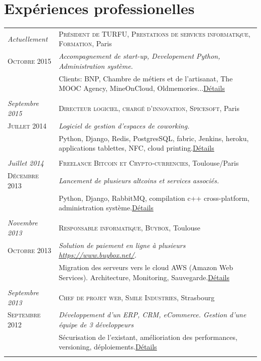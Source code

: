 \documentclass[a4paper,10pt]{article}
\begin{document}
\section{Expériences professionelles}
\begin{tabular}{p{}|p{}}	

	\emph{Actuellement} & \textsc{Président de TURFU, Prestations de services informatique, Formation}, Paris \\\textsc{Octobre 2015}&\emph{Accompagnement de start-up, Developement Python, Administration système.}\\&\footnotesize{Clients: BNP, Chambre de métiers et de l'artisanat, The MOOC Agency, MineOnCloud, Oldmemories...\hyperlink{freelance}{\hfill \footnotesize Détails}}\\\multicolumn{2}{c}{} \\
	
	\emph{Septembre 2015} & \textsc{Directeur logiciel, chargé d'innovation, Spicesoft}, Paris \\\textsc{Juillet 2014}&\emph{Logiciel de gestion d'espaces de coworking.}\\&\footnotesize{Python, Django, Redis, PostgresSQL, fabric, Jenkins, heroku, applications tablettes, NFC, cloud printing.\hyperlink{spicesoft}{\hfill \footnotesize Détails}}\\\multicolumn{2}{c}{} \\
	
	\emph{Juillet 2014} & \textsc{Freelance Bitcoin et Crypto-currencies}, Toulouse/Paris \\\textsc{Décembre 2013}&\emph{Lancement de plusieurs altcoins et services associés.}\\&\footnotesize{Python, Django, RabbitMQ, compilation c++ cross-platform, administration système.\hyperlink{bitcoin}{\hfill \footnotesize Détails}}\\\multicolumn{2}{c}{} \\

	\emph{Novembre 2013} & \textsc{Responsable informatique, Buybox}, Toulouse \\\textsc{Octobre 2013}&\emph{Solution de paiement en ligne à plusieurs \href{https://www.buybox.net/}{https://www.buybox.net/}.}\\&\footnotesize{Migration des serveurs vers le cloud AWS (Amazon Web Services). Architecture, Monitoring, Sauvegarde.\hyperlink{buybox}{\hfill \footnotesize Détails}}\\\multicolumn{2}{c}{} \\
	\emph{Septembre 2013} & \textsc{Chef de projet web, Smile Industries}, Strasbourg \\\textsc{Septembre 2012}&\emph{Développement d'un ERP, CRM, eCommerce. Gestion d'une équipe de 3 développeurs}\\&\footnotesize{Sécurisation de l'existant, amélioriation des performances, versioning, déploiements.\hyperlink{axess}{\hfill \footnotesize Détails}}\\\multicolumn{2}{c}{} \\


\end{tabular}
\end{document}
